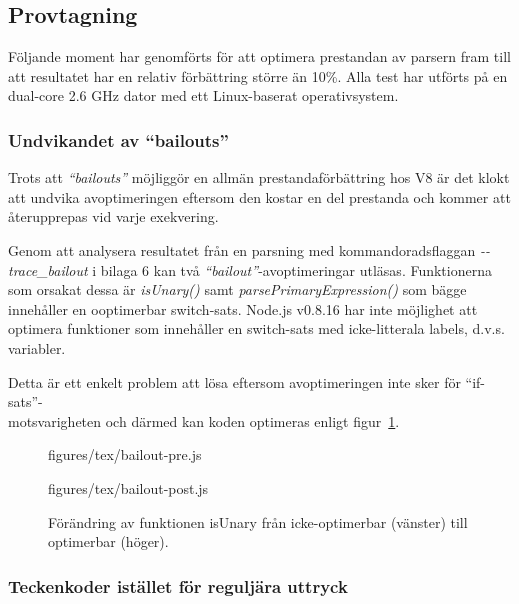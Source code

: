 \subsection{Provtagning}

Följande moment har genomförts för att optimera prestandan av parsern fram
till att resultatet har en relativ förbättring större än 10\%. Alla test har
utförts på en dual-core 2.6 GHz dator med ett Linux-baserat operativsystem.

\subsubsection{Undvikandet av ``bailouts''}

Trots att \textit{``bailouts''} möjliggör en allmän prestandaförbättring hos
V8 är det klokt att undvika avoptimeringen eftersom den kostar en del
prestanda och kommer att återupprepas vid varje exekvering.

Genom att analysera resultatet från en parsning med kommandoradsflaggan
\mbox{\textit{-{}-trace_bailout}} i bilaga 6 kan två
\textit{``bailout''}-avoptimeringar utläsas.  Funktionerna som orsakat dessa
är \textit{isUnary()} samt \textit{parsePrimaryExpression()} som bägge
innehåller en ooptimerbar switch-sats. \mbox{Node.js} v0.8.16 har inte
möjlighet att optimera funktioner som innehåller en switch-sats med
icke-litterala labels, d.v.s. variabler.

Detta är ett enkelt problem att lösa eftersom avoptimeringen inte sker för
``if-sats''-\\motsvarigheten och därmed kan koden optimeras enligt
figur~\ref{fig:bailout}.

\begin{figure}[ht]
  \begin{minipage}[t]{0.5\textwidth}
      {figures/tex/bailout-pre.js}
  \end{minipage}%
  \begin{minipage}[t]{0.5\textwidth}
      {figures/tex/bailout-post.js}
  \end{minipage}
  \caption{Förändring av funktionen isUnary från icke-optimerbar (vänster) till
    optimerbar (höger).}
  \label{fig:bailout}
\end{figure}

\subsubsection{Teckenkoder istället för reguljära uttryck}

